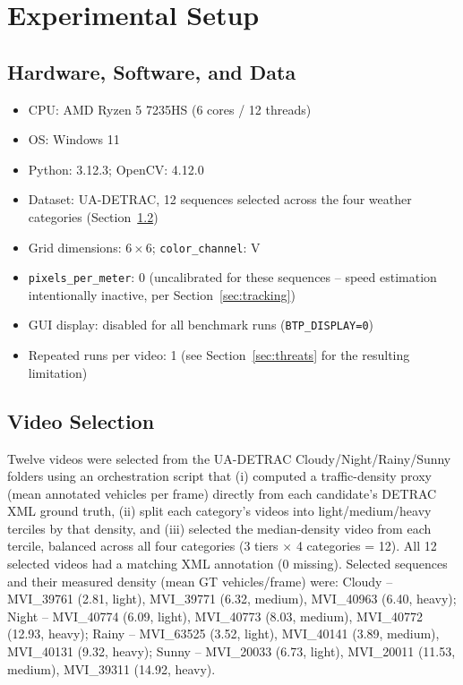 \documentclass[conference]{IEEEtran}
\newcommand{\code}[1]{\texttt{#1}}
\begin{document}
\section{Experimental Setup}
\label{sec:experiments}

\subsection{Hardware, Software, and Data}
\begin{itemize}
\item CPU: AMD Ryzen 5 7235HS (6 cores / 12 threads)
\item OS: Windows 11
\item Python: 3.12.3; OpenCV: 4.12.0
\item Dataset: UA-DETRAC, 12 sequences selected across the four weather
categories (Section~\ref{sec:selection-detail})
\item Grid dimensions: $6\times6$; \code{color\_channel}: V
\item \code{pixels\_per\_meter}: 0 (uncalibrated for these sequences --
speed estimation intentionally inactive, per Section~\ref{sec:tracking})
\item GUI display: disabled for all benchmark runs (\code{BTP\_DISPLAY=0})
\item Repeated runs per video: 1 (see Section~\ref{sec:threats} for the
resulting limitation)
\end{itemize}

\subsection{Video Selection}
\label{sec:selection-detail}
Twelve videos were selected from the UA-DETRAC Cloudy/Night/Rainy/Sunny
folders using an orchestration script that (i) computed a traffic-density
proxy (mean annotated vehicles per frame) directly from each candidate's
DETRAC XML ground truth, (ii) split each category's videos into
light/medium/heavy terciles by that density, and (iii) selected the
median-density video from each tercile, balanced across all four
categories (3 tiers $\times$ 4 categories = 12). All 12 selected videos
had a matching XML annotation (0 missing). Selected sequences and their
measured density (mean GT vehicles/frame) were: Cloudy --
MVI\_39761 (2.81, light), MVI\_39771 (6.32, medium), MVI\_40963 (6.40,
heavy); Night -- MVI\_40774 (6.09, light), MVI\_40773 (8.03, medium),
MVI\_40772 (12.93, heavy); Rainy -- MVI\_63525 (3.52, light), MVI\_40141
(3.89, medium), MVI\_40131 (9.32, heavy); Sunny -- MVI\_20033 (6.73,
light), MVI\_20011 (11.53, medium), MVI\_39311 (14.92, heavy).
\end{document}
